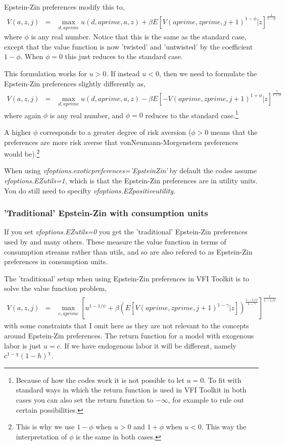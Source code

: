 Epstein-Zin preferences modify this to,
\begin{eqnarray*}
 V(a,z,j)&=& \max_{d,aprime} u(d,aprime,a,z) + \beta E[V(aprime,zprime,j+1)^{1-\phi}|z]^{\frac{1}{1-\phi}}
\end{eqnarray*}
where $\phi$ is any real number. Notice that this is the same as the standard case, except that the value function is now 'twisted' and 'untwisted' by the coefficient $1-\phi$. When $\phi=0$ this just reduces to the standard case.

This formulation works for $u > 0$. If instead $u<0$, then we need to formulate the Epstein-Zin preferences slightly differently as,
\begin{eqnarray*}
 V(a,z,j)&=& \max_{d,aprime} u(d,aprime,a,z) - \beta E[ -V(aprime,zprime,j+1)^{1+\phi}|z]^{\frac{1}{1+\phi}}
\end{eqnarray*}
where again $\phi$ is any real number, and $\phi=0$ reduces to the standard case.\footnote{Because of how the codes work it is not possible to let $u=0$. To fit with standard ways in which the return function is used in VFI Toolkit in both cases you can also set the return function to $-\infty$, for example to rule out certain possibilities.}

A higher $\phi$ corresponds to a greater degree of risk aversion ($\phi>0$ means that the preferences are more risk averse that vonNeumann-Morgenstern preferences would be).\footnote{This is why we use $1-\phi$ when $u>0$ and $1+\phi$ when $u<0$. This way the interpretation of $\phi$ is the same in both cases.}

When using \textit{vfoptions.exoticpreferences='EpsteinZin'} by default the codes assume \textit{vfoptions.EZutils=1}, which is that the Epstein-Zin preferences are in utility units. You do still need to specifty \textit{vfoptions.EZpositiveutility}.

\subsubsection{'Traditional' Epstein-Zin with consumption units}
If you set \textit{vfoptions.EZutils=0} you get the 'traditional' Epstein-Zin preferences used by \cite*{EpsteinZin1989} and many others. These measure the value function in terms of consumption streams rather than utils, and so are also refered to as Epstein-Zin preferences in consumption units.

The 'traditional' setup when using Epstein-Zin preferences in VFI Toolkit is to solve the value function problem,
\begin{eqnarray*}
 V(a,z,j)&=& \max_{c,aprime} \left[ u^{1-1/\psi} + \beta  (E[V(aprime,zprime,j+1)^{1-\gamma}|z])^{\frac{1-1/\psi}{1-\gamma}}\right]^{\frac{1}{1-1/\psi}}
\end{eqnarray*}
with some constraints that I omit here as they are not relevant to the concepts around Epstein-Zin preferences. The return function for a model with exogenous labor is just $u=c$. If we have endogenous labor it will be different, namely $c^{1-\chi} (1-h)^{\chi}$.

